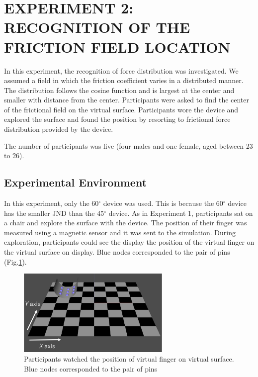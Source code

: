 \section{EXPERIMENT 2: RECOGNITION OF THE FRICTION FIELD LOCATION}

In this experiment, the recognition of force distribution was investigated.
We assumed a field in which the friction coefficient varies in a distributed manner.
The distribution follows the cosine function and is largest at the center and smaller with distance from the center.
Participants were asked to find the center of the frictional field on the virtual surface.
Participants wore the device and explored the surface and found the position by resorting to frictional force distribution provided by the device.

The number of participants was five (four males and one female, aged between 23 to 26).

\subsection{Experimental Environment}

In this experiment, only the 60$^{\circ}$ device was used. 
This is because the 60$^{\circ}$ device has the smaller JND than the 45$^{\circ}$ device.
As in Experiment 1, participants sat on a chair and explore the surface with the device. 
The position of their finger was measured using a magnetic sensor and it was sent to the simulation. 
During exploration, participants could see the display the position of the virtual finger on the virtual surface on display. Blue nodes corresponded to the pair of pins (Fig.\ref{fig_experimental_window}).


\begin{figure}[h]
  \centering
  \includegraphics[width=2.9in]{images/fig_experimental_window.png}
  \caption{Participants watched the position of virtual finger on virtual surface. Blue nodes corresponded to the pair of pins}
  \label{fig_experimental_window}
\end{figure}

